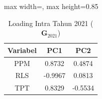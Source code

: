 \begin{table}[H]
\centering
\caption{Loading Intra Tahun 2021 ($\mathbf{G}_{2021}$)} \label{tab:loading_intra_2021}
\begin{adjustbox}{max width=\textwidth, max height=0.85\textheight}
\begin{tabular}{|c|c|c|}
\hline
\textbf{Variabel} & \textbf{PC1} & \textbf{PC2} \\
\hline
PPM & 0.8732 & 0.4874 \\
RLS & -0.9967 & 0.0813 \\
TPT & 0.8329 & -0.5534 \\
\hline
\end{tabular}
\end{adjustbox}
\end{table}